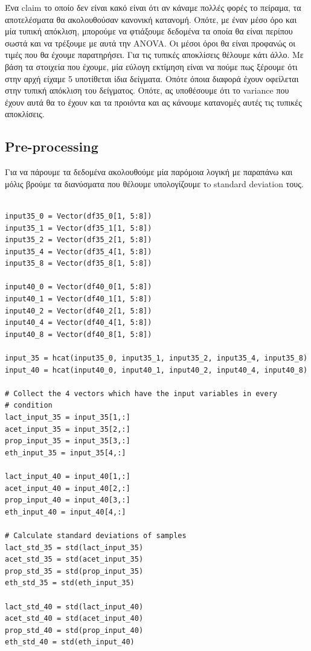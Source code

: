 \documentclass[11pt]{article}
\begin{document}
Ένα claim το οποίο δεν είναι κακό είναι ότι αν κάναμε πολλές φορές το πείραμα, τα αποτελέσματα θα ακολουθούσαν κανονική κατανομή. Οπότε, με έναν μέσο όρο και μία τυπική απόκλιση, μπορούμε να φτιάξουμε δεδομένα τα οποία θα είναι περίπου σωστά και να τρέξουμε με αυτά την ANOVA. Οι μέσοι όροι θα είναι προφανώς οι τιμές που θα έχουμε παρατηρήσει. Για τις τυπικές αποκλίσεις θέλουμε κάτι άλλο. Με βάση τα στοιχεία που έχουμε, μία εύλογη εκτίμηση είναι να πούμε πως ξέρουμε ότι στην αρχή είχαμε 5 υποτίθεται ίδια δείγματα. Οπότε όποια διαφορά έχουν οφείλεται στην τυπική απόκλιση του δείγματος. Οπότε, ας υποθέσουμε ότι το variance που έχουν αυτά θα το έχουν και τα προιόντα και ας κάνουμε κατανομές αυτές τις τυπικές αποκλίσεις.

\subsection{Pre-processing}
\label{sec:org107e70f}
Για να πάρουμε τα δεδομένα ακολουθούμε μία παρόμοια λογική με παραπάνω και μόλις βρούμε τα διανύσματα που θέλουμε υπολογίζουμε τo standard deviation τους.

\begin{verbatim}

input35_0 = Vector(df35_0[1, 5:8])
input35_1 = Vector(df35_1[1, 5:8])
input35_2 = Vector(df35_2[1, 5:8])
input35_4 = Vector(df35_4[1, 5:8])
input35_8 = Vector(df35_8[1, 5:8])

input40_0 = Vector(df40_0[1, 5:8])
input40_1 = Vector(df40_1[1, 5:8])
input40_2 = Vector(df40_2[1, 5:8])
input40_4 = Vector(df40_4[1, 5:8])
input40_8 = Vector(df40_8[1, 5:8])

input_35 = hcat(input35_0, input35_1, input35_2, input35_4, input35_8)
input_40 = hcat(input40_0, input40_1, input40_2, input40_4, input40_8)

# Collect the 4 vectors which have the input variables in every
# condition
lact_input_35 = input_35[1,:]
acet_input_35 = input_35[2,:]
prop_input_35 = input_35[3,:]
eth_input_35 = input_35[4,:]

lact_input_40 = input_40[1,:]
acet_input_40 = input_40[2,:]
prop_input_40 = input_40[3,:]
eth_input_40 = input_40[4,:]

# Calculate standard deviations of samples
lact_std_35 = std(lact_input_35)
acet_std_35 = std(acet_input_35)
prop_std_35 = std(prop_input_35)
eth_std_35 = std(eth_input_35)

lact_std_40 = std(lact_input_40)
acet_std_40 = std(acet_input_40)
prop_std_40 = std(prop_input_40)
eth_std_40 = std(eth_input_40)
\end{verbatim}
\end{document}
